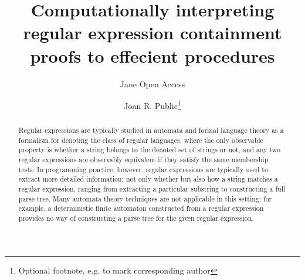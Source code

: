 \documentclass[a4paper,UKenglish,cleveref, autoref, thm-restate]{lipics-v2021}
\title{Computationally interpreting regular expression containment proofs to effecient procedures } %
\author{Jane {Open Access}}{Dummy University Computing Laboratory, [optional: Address], Country \and My second affiliation, Country \and \url{http://www.myhomepage.edu} }{johnqpublic@dummyuni.org}{https://orcid.org/0000-0002-1825-0097}{(Optional) author-specific funding acknowledgements}%
\author{Joan R. Public\footnote{Optional footnote, e.g. to mark corresponding author}}{Department of Informatics, Dummy College, [optional: Address], Country}{joanrpublic@dummycollege.org}{[orcid]}{[funding]}
\begin{document}


\maketitle

\begin{abstract}
 Regular expressions are typically studied in automata and formal language theory as a formalism for denoting the class of regular languages, where the only observable property is whether a string belongs to the denoted set of strings or not, and any two regular expressions are observably equivalent if they satisfy the same membership tests.  In programming practice, however, regular expressions are typically used to extract more detailed information: not only whether but also how a string matches a regular expression, ranging from extracting a particular substring to constructing a full parse tree.  Many automata theory techniques are not applicable in this setting; for example, a deterministic finite automaton constructed from a regular expression provides no way of constructing a parse tree for the given regular expression.  


\end{abstract}
\end{document}
